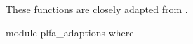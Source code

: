 These functions are closely adapted from \citet{wadler_programming_2022}.

\begin{code}
module plfa_adaptions where
\end{code}
\begin{comment}
  \begin{code}
  -- Data types (naturals, strings, characters)
  open import Data.Nat using (ℕ; zero; suc; _<_; _≥_; _≤_; _≤?_; _<?_; z≤n; s≤s; _⊔_)
    renaming (_≟_ to _≟ℕ_)
  open import Data.Nat.Properties using (≤-refl; ≤-trans; ≤-<-trans; <-≤-trans; ≤-antisym; ≤-total;
    +-mono-≤; n≤1+n; m≤n⇒m≤1+n; suc-injective; <⇒≢; ≰⇒>; ≮⇒≥)
  open import Data.String using (String; fromList) renaming (_≟_ to _≟str_; _++_ to _++str_;
    length to str-length; toList to ⟪_⟫)
  open import Data.Char using (Char)
  open import Data.Char.Properties using () renaming (_≟_ to _≟char_)
  
  -- Function manipulation.
  open import Function using (_∘_; flip; it; id; case_returning_of_)
  
  -- Relations and predicates/decidability.
  import Relation.Binary.PropositionalEquality as Eq
  open Eq using (_≡_; _≢_; refl; sym; trans; cong; cong-app; cong₂)
  open Eq.≡-Reasoning using (begin_; step-≡-∣; step-≡-⟩; _∎)
  open import Relation.Binary.Definitions using (DecidableEquality)
  open import Relation.Nullary.Decidable using (Dec; yes; no; True; False; toWitnessFalse;
    toWitness; fromWitness; ¬?; ⌊_⌋; From-yes)
  open import Relation.Unary using (Decidable)
  open import Relation.Binary using () renaming (Decidable to BinaryDecidable)
  open import Relation.Nullary.Negation using (¬_; contradiction)
  open import Data.Empty using (⊥-elim)
  
  -- Products and exists quantifier.
  open import Data.Product using (_×_; proj₁; proj₂; ∃-syntax) renaming (_,_ to ⟨_,_⟩)
  open import Data.Sum using (_⊎_; inj₁; inj₂)
  
  -- Lists.
  open import Data.List using (List; []; _∷_; _++_; length; filter; map; foldr; head; replicate)
  open import Data.List.Properties using (≡-dec)
  import Data.List.Membership.DecPropositional as DecPropMembership
  open import Data.List.Relation.Unary.All using (All; all?; lookup)
    renaming (fromList to All-fromList; toList to All-toList; map to All-map)
  open import Data.List.Relation.Unary.Any using (Any; here; there)
  open import Data.List.Extrema Data.Nat.Properties.≤-totalOrder using (max; xs≤max)
  
  -- Import list membership using List Char comparisons.
  private
    _≟lchar_ : ∀ (xs ys : List Char) → Dec (xs ≡ ys)
    xs ≟lchar ys = ≡-dec (_≟char_) xs ys
  
  open DecPropMembership _≟lchar_ using (_∈_; _∉_; _∈?_)
  \end{code}
\end{comment}
